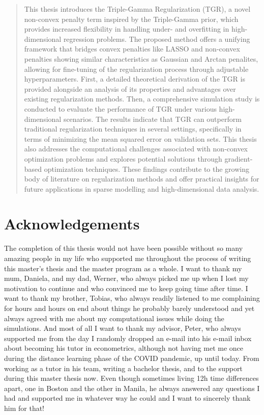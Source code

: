 \documentclass[12pt,a4paper]{article}
\begin{document}
\begin{abstract}
This thesis introduces the Triple-Gamma Regularization (TGR), a novel non-convex penalty term inspired by the Triple-Gamma prior, which provides increased flexibility in handling under- and overfitting in high-dimensional regression problems. The proposed method offers a unifying framework that bridges convex penalties like LASSO and non-convex penalties showing similar characteristics as Gaussian and Arctan penalites, allowing for fine-tuning of the regularization process through adjustable hyperparameters. First, a detailed theoretical derivation of the TGR is provided alongside an analysis of its properties and advantages over existing regularization methods. Then, a comprehensive simulation study is conducted to evaluate the performance of TGR under various high-dimensional scenarios. The results indicate that TGR can outperform traditional regularization techniques in several settings, specifically in terms of minimizing the mean squared error on validation sets. This thesis also addresses the computational challenges associated with non-convex optimization problems and explores potential solutions through gradient-based optimization techniques. These findings contribute to the growing body of literature on regularization methods and offer practical insights for future applications in sparse modelling and high-dimensional data analysis.
\end{abstract}

\clearpage

\section*{Acknowledgements}
\thispagestyle{empty}

The completion of this thesis would not have been possible without so many amazing people in my life who supported me throughout the process of writing this master's thesis and the master program as a whole. I want to thank my mum, Daniela, and my dad, Werner, who always picked me up when I lost my motivation to continue and who convinced me to keep going time after time. I want to thank my brother, Tobias, who always readily listened to me complaining for hours and hours on end about things he probably barely understood and yet always agreed with me about my computational issues while doing the simulations. And most of all I want to thank my advisor, Peter, who always supported me from the day I randomly dropped an e-mail into his e-mail inbox about becoming his tutor in econometrics, although not having met me once during the distance learning phase of the COVID pandemic, up until today. From working as a tutor in his team, writing a bachelor thesis, and to the support during this master thesis now. Even though sometimes living 12h time differences apart, one in Boston and the other in Manila, he always answered any questions I had and supported me in whatever way he could and I want to sincerely thank him for that!  
\end{document}
